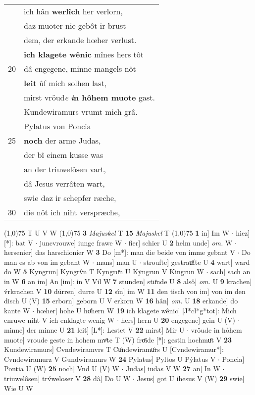 \documentclass[8pt,a4paper,notitlepage]{article}
\begin{document}
\begin{table}[ht]
\begin{minipage}[t]{0.5\linewidth}
\begin{tabular}{rl}
 & ich hân \textbf{werlîch} her verlorn,\\ 
 & daz muoter nie gebôt ir brust\\ 
 & dem, der erkande hœher verlust.\\ 
 & \textbf{ich klagete wênic} mînes hers tôt\\ 
20 & dâ engegene, minne mangels nôt\\ 
 & \textbf{leit} ûf mich solhen last,\\ 
 & mirst vröud\textit{e} \textbf{\textit{i}n hôhem muote} gast.\\ 
 & Kundewiramurs vrumt mich grâ.\\ 
 & Pylatus von Poncia\\ 
25 & \textbf{noch} der arme Judas,\\ 
 & der bî einem kusse was\\ 
 & an der triuwelôsen vart,\\ 
 & dâ Jesus verrâten wart,\\ 
 & swie daz ir schepfer ræche,\\ 
30 & die nôt ich niht verspræche,\\ 
\end{tabular}
\scriptsize
\line(1,0){75} \newline
T U V W \newline
\line(1,0){75} \newline
\textbf{3} \textit{Majuskel} T  \textbf{15} \textit{Majuskel} T  \newline
\line(1,0){75} \newline
\textbf{1} in] Im W  $\cdot$ hiez] [*]: bat V  $\cdot$ juncvrouwe] iunge frawe W  $\cdot$ fier] schier U \textbf{2} helm unde] \textit{om.} W  $\cdot$ hersenier] das harschionier W \textbf{3} Do [m*]: man die beide von imme gebant V  $\cdot$ Do man es ab von im gebant W  $\cdot$ mans] man U  $\cdot$ stroufte] gestrauͦfte U \textbf{4} wart] ward do W \textbf{5} Kyngrun] Kyngrv̂n T Kyngruͦn U Kẏngrun V Kingrun W  $\cdot$ sach] sach an in W \textbf{6} an im] An [im]: in V Vil W \textbf{7} stunden] stuͦnde U \textbf{8} alsô] \textit{om.} U \textbf{9} krachen] v́rkrachen V \textbf{10} dürren] durre U \textbf{12} sîn] im W \textbf{11} den tisch von im] von im den disch U (V) \textbf{15} erborn] geborn U V erkorn W \textbf{16} hân] \textit{om.} U \textbf{18} erkande] do kante W  $\cdot$ hœher] hohe U hoͤhern W \textbf{19} ich klagete wênic] [J*cl*g*tot]: Mich enruwe niht V ich enklagte wenig W  $\cdot$ hers] hern U \textbf{20} engegene] gein U (V)  $\cdot$ minne] der minne U \textbf{21} leit] [L*]: Lestet V \textbf{22} mirst] Mir U  $\cdot$ vröude in hôhem muote] vroude geste in hohem mvͦte T (W) froͤide [*]: gestin hochmuͦt  V \textbf{23} Kundewiramurs] Cvndewiramvrs T Cuͦndewiramuͦrs U [Cvndewiramur*]: Cvndewiramurz V Gundwiramurs W \textbf{24} Pylatus] Pyltos U Pẏlatus V  $\cdot$ Poncia] Pontia U (W) \textbf{25} noch] Vnd U (V) W  $\cdot$ Judas] iudas V W \textbf{27} an] In W  $\cdot$ triuwelôsen] trv́weloser V \textbf{28} dâ] Do U W  $\cdot$ Jesus] got U ihesus V (W) \textbf{29} swie] Wie U W \newline
\end{minipage}
\end{table}
\end{document}
